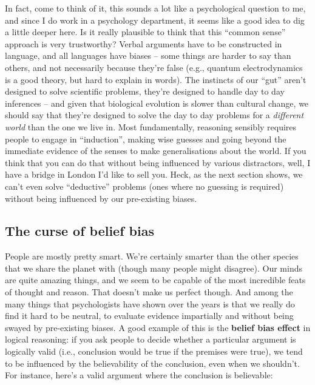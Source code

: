 \documentclass[
]{book}
\begin{document}
In fact, come to think of it, this sounds a lot like a psychological question to me, and since I do work in a psychology department, it seems like a good idea to dig a little deeper here. Is it really plausible to think that this ``common sense'' approach is very trustworthy? Verbal arguments have to be constructed in language, and all languages have biases -- some things are harder to say than others, and not necessarily because they're false (e.g., quantum electrodynamics is a good theory, but hard to explain in words). The instincts of our ``gut'' aren't designed to solve scientific problems, they're designed to handle day to day inferences -- and given that biological evolution is slower than cultural change, we should say that they're designed to solve the day to day problems for a \emph{different world} than the one we live in. Most fundamentally, reasoning sensibly requires people to engage in ``induction'', making wise guesses and going beyond the immediate evidence of the senses to make generalisations about the world. If you think that you can do that without being influenced by various distractors, well, I have a bridge in London I'd like to sell you. Heck, as the next section shows, we can't even solve ``deductive'' problems (ones where no guessing is required) without being influenced by our pre-existing biases.

\hypertarget{the-curse-of-belief-bias}{%
\subsection{The curse of belief bias}\label{the-curse-of-belief-bias}}

People are mostly pretty smart. We're certainly smarter than the other species that we share the planet with (though many people might disagree). Our minds are quite amazing things, and we seem to be capable of the most incredible feats of thought and reason. That doesn't make us perfect though. And among the many things that psychologists have shown over the years is that we really do find it hard to be neutral, to evaluate evidence impartially and without being swayed by pre-existing biases. A good example of this is the \textbf{belief bias effect} in logical reasoning: if you ask people to decide whether a particular argument is logically valid (i.e., conclusion would be true if the premises were true), we tend to be influenced by the believability of the conclusion, even when we shouldn't. For instance, here's a valid argument where the conclusion is believable:
\end{document}
